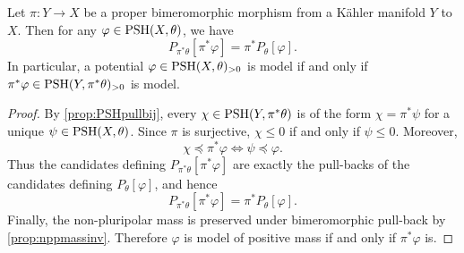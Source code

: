 \begin{proposition}\label{prop:Penvbimero}
    Let $\pi\colon Y\rightarrow X$ be a proper bimeromorphic morphism from a Kähler manifold $Y$ to $X$. Then for any $\varphi\in \mathrm{PSH}(X,\theta)$, we have
    \[
        P_{\pi^*\theta}[\pi^*\varphi]=\pi^*P_{\theta}[\varphi].
    \]
    In particular, a potential $\varphi\in \mathrm{PSH}(X,\theta)_{>0}$ is model if and only if $\pi^*\varphi\in \mathrm{PSH}(Y,\pi^*\theta)_{>0}$ is model.
\end{proposition}
\begin{proof}
    By \cref{prop:PSHpullbij}, every $\chi\in\mathrm{PSH}(Y,\pi^*\theta)$ is of the form $\chi=\pi^*\psi$ for a unique $\psi\in\mathrm{PSH}(X,\theta)$. Since $\pi$ is surjective, $\chi\leq 0$ if and only if $\psi\leq 0$. Moreover,
    \[
        \chi\preceq \pi^*\varphi \Longleftrightarrow \psi\preceq \varphi.
    \]
    Thus the candidates defining $P_{\pi^*\theta}[\pi^*\varphi]$ are exactly the pull-backs of the candidates defining $P_\theta[\varphi]$, and hence
    \[
        P_{\pi^*\theta}[\pi^*\varphi]=\pi^*P_\theta[\varphi].
    \]
    Finally, the non-pluripolar mass is preserved under bimeromorphic pull-back by \cref{prop:nppmassinv}. Therefore $\varphi$ is model of positive mass if and only if $\pi^*\varphi$ is.
\end{proof}

